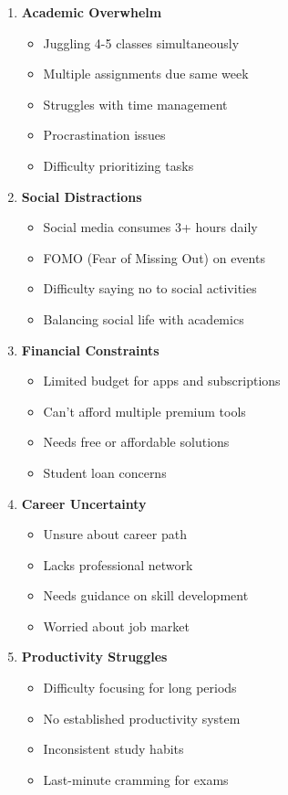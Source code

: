 \begin{enumerate}
    \item \textbf{Academic Overwhelm}
    \begin{itemize}
        \item Juggling 4-5 classes simultaneously
        \item Multiple assignments due same week
        \item Struggles with time management
        \item Procrastination issues
        \item Difficulty prioritizing tasks
    \end{itemize}
    
    \item \textbf{Social Distractions}
    \begin{itemize}
        \item Social media consumes 3+ hours daily
        \item FOMO (Fear of Missing Out) on events
        \item Difficulty saying no to social activities
        \item Balancing social life with academics
    \end{itemize}
    
    \item \textbf{Financial Constraints}
    \begin{itemize}
        \item Limited budget for apps and subscriptions
        \item Can't afford multiple premium tools
        \item Needs free or affordable solutions
        \item Student loan concerns
    \end{itemize}
    
    \item \textbf{Career Uncertainty}
    \begin{itemize}
        \item Unsure about career path
        \item Lacks professional network
        \item Needs guidance on skill development
        \item Worried about job market
    \end{itemize}
    
    \item \textbf{Productivity Struggles}
    \begin{itemize}
        \item Difficulty focusing for long periods
        \item No established productivity system
        \item Inconsistent study habits
        \item Last-minute cramming for exams
    \end{itemize}
\end{enumerate}

